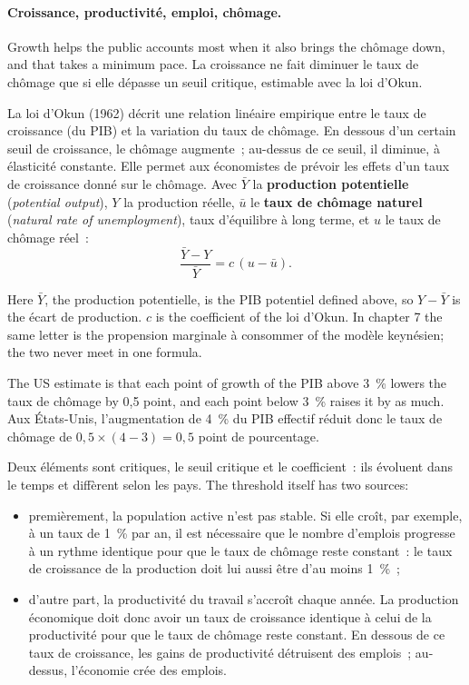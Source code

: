 \paragraph{Croissance, productivité, emploi, chômage.}
Growth helps the public accounts most when it also brings the chômage down,
and that takes a minimum pace. La croissance ne fait diminuer le taux de
chômage que si elle dépasse un seuil critique, estimable avec la loi d'Okun.

\begin{definition}
  La loi d'Okun (1962) décrit une relation linéaire empirique entre le taux de
  croissance (du PIB) et la variation du taux de chômage. En dessous d'un
  certain seuil de croissance, le chômage augmente~; au-dessus de ce seuil, il
  diminue, à élasticité constante. Elle permet aux économistes de prévoir les
  effets d'un taux de croissance donné sur le chômage. Avec $\bar{Y}$ la
  \textbf{production potentielle} (\textit{potential output}), $Y$ la
  production réelle, $\bar{u}$ le \textbf{taux de chômage naturel}
  (\textit{natural rate of unemployment}), taux d'équilibre à long terme, et
  $u$ le taux de chômage réel~:
  \[ \frac{\bar{Y} - Y}{\bar{Y}} = c\,(u - \bar{u}). \]
\end{definition}

\begin{notation}
  Here $\bar{Y}$, the production potentielle, is the PIB potentiel defined above,
  so $Y - \bar{Y}$ is the écart de production. $c$ is the coefficient of the loi
  d'Okun. In chapter 7 the same letter
  is the propension marginale à consommer of the modèle keynésien; the two
  never meet in one formula.
\end{notation}

\begin{example}
  The US estimate is that each point of growth of the PIB above 3~\% lowers
  the taux de chômage by 0,5 point, and each point below 3~\% raises it by as
  much. Aux États-Unis, l'augmentation de 4~\% du PIB effectif réduit donc le
  taux de chômage de $0{,}5 \times (4 - 3) = 0{,}5$ point de pourcentage.
\end{example}

Deux éléments sont critiques, le seuil critique et le coefficient~: ils
évoluent dans le temps et diffèrent selon les pays. The threshold itself has two
sources:
\begin{itemize}
  \item premièrement, la population active n'est pas stable. Si elle croît, par
    exemple, à un taux de 1~\% par an, il est nécessaire que le nombre
    d'emplois progresse à un rythme identique pour que le taux de chômage reste
    constant~: le taux de croissance de la production doit lui aussi être d'au
    moins 1~\%~;
  \item d'autre part, la productivité du travail s'accroît chaque année. La
    production économique doit donc avoir un taux de croissance identique à
    celui de la productivité pour que le taux de chômage reste constant. En
    dessous de ce taux de croissance, les gains de productivité détruisent des
    emplois~; au-dessus, l'économie crée des emplois.
\end{itemize}

